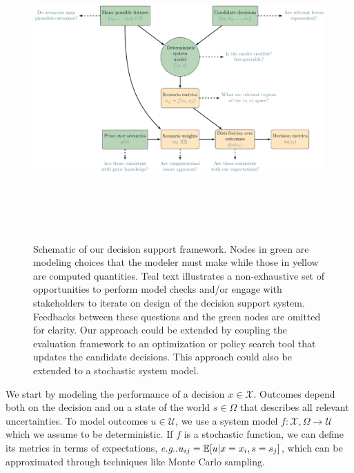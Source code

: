\documentclass[12pt]{article}
\makeatletter
\DeclareRobustCommand\onedot{\futurelet\@let@token\@onedot}
\def\@onedot{\ifx\@let@token.\else.\null\fi\xspace}
\def\eg{\emph{e.g}\onedot} \def\Eg{\emph{E.g}\onedot}
\makeatother
\begin{document}
\begin{figure}
    \centering
    \includegraphics[width=\textwidth, height=4.5in, keepaspectratio=true]{conceptual.pdf}
    \caption{
        Schematic of our decision support framework.
        Nodes in green are modeling choices that the modeler must make while those in yellow are computed quantities.
        Teal text illustrates a non-exhaustive set of opportunities to perform model checks and/or engage with stakeholders to iterate on design of the decision support system.
        Feedbacks between these questions and the green nodes are omitted for clarity.
        Our approach could be extended by coupling the evaluation framework to an optimization or policy search tool that updates the candidate decisions.
        This approach could also be extended to a stochastic system model.
    }\label{fig:framework}
\end{figure}

We start by modeling the performance of a decision $x \in \mathcal{X}$.
Outcomes depend both on the decision and on a state of the world $s \in \Omega$ that describes all relevant uncertainties.
To model outcomes $u \in \mathcal{U}$, we use a system model $f: \mathcal{X}, \Omega \rightarrow \mathcal{U}$ \citep[we generally follow the notation of][]{mcphail_robustness:2019} which we assume to be deterministic.
If $f$ is a stochastic function, we can define its metrics in terms of expectations, \eg $u_{ij} = \mathbb{E}\qty[u | x=x_i, s=s_j]$, which can be approximated through techniques like Monte Carlo sampling.
\end{document}
